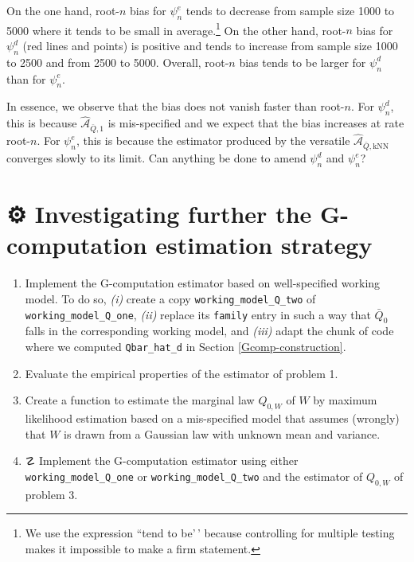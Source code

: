 \documentclass[
  11pt,
  openright,twoside]{book}
\newcommand{\gear}{\usebox{\gearbox}\;}
\DeclareRobustCommand{\stixdanger}{%
  {\usefont{U}{stixbbit}{m}{it}\symbol{"F6}}%
}
\newcommand{\Algo}{\widehat{\mathcal{A}}}
\newcommand{\Qbar}{\bar{Q}}
\theoremstyle{definition}
\theoremstyle{definition}
\theoremstyle{definition}
\theoremstyle{definition}
\theoremstyle{remark}
\begin{document}
On the one hand, root-\(n\) bias for \(\psi_{n}^{e}\) tends to decrease from
sample size 1000 to 5000 where it tends to be small in
average.\footnote{We use the expression ``tend to be'\,' because controlling for
  multiple testing makes it impossible to make a firm statement.} On the other
hand, root-\(n\) bias for \(\psi_{n}^{d}\) (red lines and points) is positive and
tends to increase from sample size 1000 to 2500 and from
2500 to 5000. Overall, root-\(n\) bias tends to be
larger for \(\psi_{n}^{d}\) than for \(\psi_{n}^{e}\).

In essence, we observe that the bias does not vanish faster than root-\(n\). For
\(\psi_{n}^{d}\), this is because \(\Algo_{\Qbar,1}\) is mis-specified and we
expect that the bias increases at rate root-\(n\). For \(\psi_{n}^{e}\), this is
because the estimator produced by the versatile \(\Algo_{\Qbar,\text{kNN}}\)
converges slowly to its limit. Can anything be done to amend \(\psi_{n}^{d}\)
and \(\psi_{n}^{e}\)?

\hypertarget{exo-plug-in-estimate}{%
\section{\texorpdfstring{⚙ \gear Investigating further the G-computation estimation strategy}{⚙ Investigating further the G-computation estimation strategy}}\label{exo-plug-in-estimate}}

\begin{enumerate}
\def\labelenumi{\arabic{enumi}.}
\item
  Implement the G-computation estimator based on well-specified working
  model. To do so, \emph{(i)} create a copy \texttt{working\_model\_Q\_two} of
  \texttt{working\_model\_Q\_one}, \emph{(ii)} replace its \texttt{family} entry in such a way that
  \(\Qbar_{0}\) falls in the corresponding working model, and \emph{(iii)} adapt the
  chunk of code where we computed \texttt{Qbar\_hat\_d} in Section
  \ref{Gcomp-construction}.
\item
  Evaluate the empirical properties of the estimator of problem 1.
\item
  Create a function to estimate the marginal law \(Q_{0,W}\) of \(W\) by maximum
  likelihood estimation based on a mis-specified model that assumes (wrongly)
  that \(W\) is drawn from a Gaussian law with unknown mean and variance.
\item
  ☡ \stixdanger{} Implement the G-computation estimator using either
  \texttt{working\_model\_Q\_one} or \texttt{working\_model\_Q\_two} and the estimator of
  \(Q_{0,W}\) of problem 3.
\end{enumerate}
\end{document}

